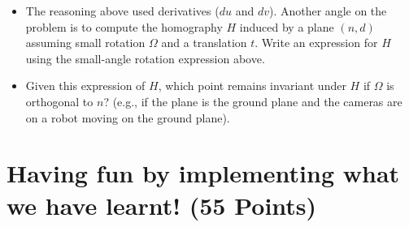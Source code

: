 \documentclass[11pt]{article}
\begin{document}
\begin{itemize}
\item The reasoning above used derivatives ($du$ and $dv$). Another angle on the problem is to compute the homography $H$ induced by 
a plane $(n,d)$ assuming small rotation $\Omega$ and a translation $t$. Write an expression for $H$ using the 
small-angle rotation expression above.

\item Given this expression of $H$, which point remains invariant under $H$ if $\Omega$ is orthogonal to $n$? (e.g., if the plane is 
the ground plane and the cameras are on a robot moving on the ground plane).
\end{itemize}


\section{Having fun by implementing what we have learnt! (55 Points)}
\end{document}
